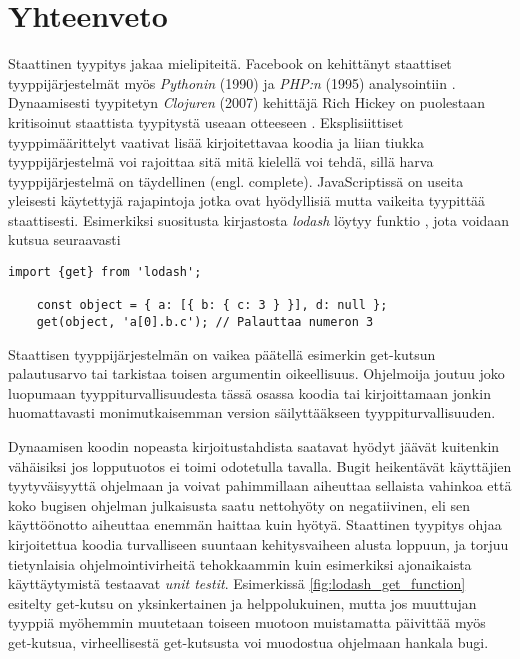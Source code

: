 \chapter{Yhteenveto}
Staattinen tyypitys jakaa mielipiteitä. Facebook on kehittänyt
staattiset tyyppijärjestelmät myös \textit{Pythonin} (1990) ja \textit{PHP:n} (1995)
analysointiin \cite{PyreCheck, HackLang}.
Dynaamisesti tyypitetyn \textit{Clojuren} (2007) kehittäjä
Rich Hickey on puolestaan kritisoinut staattista
tyypitystä useaan otteeseen \cite{10YearsOfClojure}. Eksplisiittiset
tyyppimäärittelyt vaativat lisää kirjoitettavaa koodia ja liian tiukka
tyyppijärjestelmä voi rajoittaa sitä mitä kielellä voi tehdä, sillä harva
tyyppijärjestelmä on täydellinen (engl. complete). JavaScriptissä on useita
yleisesti käytettyjä rajapintoja jotka ovat hyödyllisiä mutta vaikeita
tyypittää staattisesti. Esimerkiksi suositusta kirjastosta \textit{lodash}
löytyy funktio  \cite{LodashGet}, jota voidaan kutsua
seuraavasti

\begin{lstlisting}[caption={
	get-funktiolla voidaan palauttaa arvo syvältä
	objektin sisältä välittämättä mahdollisesti puuttuvista arvoista.},
  label={fig:lodash_get_function},
  aboveskip={20pt}
]
	import {get} from 'lodash';

	const object = { a: [{ b: { c: 3 } }], d: null };
	get(object, 'a[0].b.c'); // Palauttaa numeron 3
\end{lstlisting}

Staattisen tyyppijärjestelmän on vaikea päätellä esimerkin get-kutsun
palautusarvo tai tarkistaa toisen argumentin oikeellisuus. Ohjelmoija joutuu
joko luopumaan tyyppiturvallisuudesta tässä\newline
osassa koodia tai kirjoittamaan jonkin
huomattavasti monimutkaisemman version säilyttääkseen tyyppiturvallisuuden.

Dynaamisen koodin nopeasta kirjoitustahdista saatavat hyödyt jäävät kuitenkin
vähäisiksi jos lopputuotos ei toimi odotetulla tavalla. Bugit heikentävät
käyttäjien tyytyväisyyttä ohjelmaan ja voivat pahimmillaan aiheuttaa sellaista
vahinkoa että koko bugisen ohjelman julkaisusta saatu nettohyöty on negatiivinen,
eli sen käyttöönotto aiheuttaa enemmän haittaa kuin hyötyä. Staattinen tyypitys
ohjaa kirjoitettua koodia turvalliseen suuntaan kehitysvaiheen alusta
loppuun, ja torjuu tietynlaisia ohjelmointivirheitä tehokkaammin kuin
esimerkiksi ajonaikaista käyttäytymistä testaavat \textit{unit testit}.
Esimerkissä \ref{fig:lodash_get_function} esitelty get-kutsu on yksinkertainen
ja helppolukuinen, mutta jos muuttujan  tyyppiä myöhemmin
muutetaan toiseen muotoon muistamatta päivittää myös get-kutsua, virheellisestä
get-kutsusta voi muodostua ohjelmaan hankala bugi.

